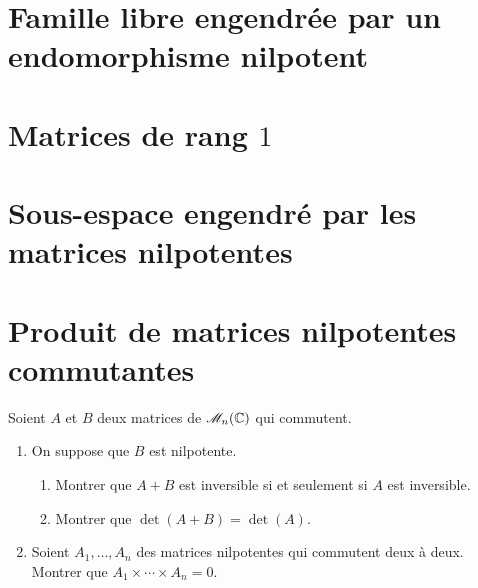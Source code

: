\section{Famille libre engendrée par un endomorphisme nilpotent} 


\section{Matrices de rang \texorpdfstring{$1$}{1}}


\section{Sous-espace engendré par les matrices nilpotentes} 


\section{Produit de matrices nilpotentes commutantes} 
\begin{exercice}
    Soient $A$ et $B$ deux matrices de $\mathscr{M}_n(\mathbb{C})$ qui commutent. 
    \begin{enumerate}
        \item On suppose que $B$ est nilpotente. 
        \begin{enumerate}
            \item Montrer que $A + B$ est inversible si et seulement si $A$ est inversible.
            \item Montrer que $\det(A+B) = \det(A)$.
        \end{enumerate}
        \item Soient $A_1, \dots, A_n$ des matrices nilpotentes qui commutent deux à deux. Montrer que $A_1 \times \cdots \times A_n = 0$.
    \end{enumerate}
\end{exercice}

